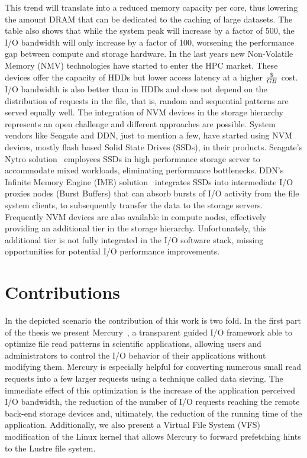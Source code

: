 This trend will translate into a reduced memory capacity per core, thus lowering the amount DRAM that can be dedicated to the caching of large datasets. The table also shows that while the system peak will 
increase by a factor of 500, the I/O bandwidth will only increase by a factor of 100, worsening the performance gap between compute and storage hardware. In the last years new Non-Volatile Memory (NMV) technologies 
have started to enter the HPC market. These devices offer the capacity of HDDs but lower access latency at a higher $ \$ \over GB $ cost. I/O bandwidth is also better than in HDDs and does not depend on 
the distribution of requests in the file, that is, random and sequential patterns are served equally well. The integration of NVM devices in the storage hierarchy represents an open challenge 
and different approaches are possible. System vendors like Seagate and DDN, just to mention a few, have started using NVM devices, mostly flash based Solid State Drives (SSDs), in their products. Seagate's Nytro 
solution~\cite{Nytro} employees SSDs in high performance storage server to accommodate mixed workloads, eliminating performance bottlenecks. DDN's Infinite Memory Engine (IME) solution~\cite{IME} integrates SSDs 
into intermediate I/O proxies nodes (Burst Buffers) that can absorb bursts of I/O activity from the file system clients, to subsequently transfer the data to the storage servers. Frequently NVM devices are also 
available in compute nodes, effectively providing an additional tier in the storage hierarchy. Unfortunately, this additional tier is not fully integrated in the I/O software stack, missing opportunities for 
potential I/O performance improvements.

\section{Contributions}
In the depicted scenario the contribution of this work is two fold. In the first part of the thesis we present Mercury~\cite{CongiuGPMSB}, a transparent guided I/O framework able to optimize file read patterns in 
scientific applications, allowing users and administrators to control the I/O behavior of their applications without modifying them. Mercury is especially helpful for converting numerous small read requests into 
a few larger requests using a technique called data sieving. The immediate effect of this optimization is the increase of the application perceived I/O bandwidth, the reduction of the number of I/O requests reaching 
the remote back-end storage devices and, ultimately, the reduction of the running time of the application. Additionally, we also present a Virtual File System (VFS) modification of the Linux kernel that allows Mercury 
to forward prefetching hints to the Lustre file system.

